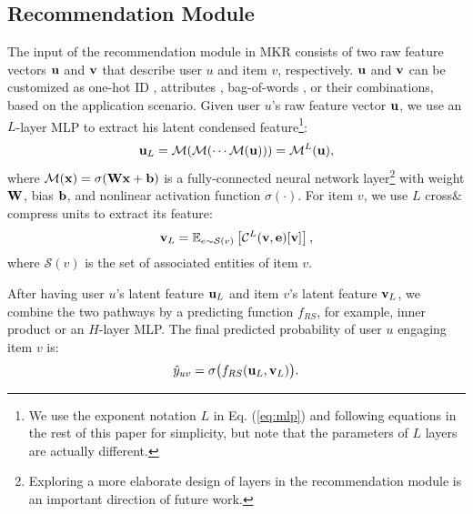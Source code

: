\documentclass[sigconf]{acmart}
\begin{document}
	\subsection{Recommendation Module}
	\label{section:rm}
		The input of the recommendation module in MKR consists of two raw feature vectors $\bf u$ and $\bf v$ that describe user $u$ and item $v$, respectively.
		$\bf u$ and $\bf v$ can be customized as one-hot ID \cite{he2017neural}, attributes \cite{wang2018shine}, bag-of-words \cite{wang2015collaborative}, or their combinations, based on the application scenario.
		Given user $u$'s raw feature vector $\bf u$, we use an $L$-layer MLP to extract his latent condensed feature\footnote{We use the exponent notation $L$ in Eq. (\ref{eq:mlp}) and following equations in the rest of this paper for simplicity, but note that the parameters of $L$ layers are actually different.}:
		\begin{equation}
		\label{eq:mlp}
			{\bf u}_L = \mathcal M (\mathcal M (\cdots \mathcal M ({\bf u}))) = \mathcal M^L ({\bf u}),
		\end{equation}				
		where $\mathcal M ({\bf x}) = \sigma ({\bf W} {\bf x} + {\bf b} )$ is a fully-connected neural network layer\footnote{Exploring a more elaborate design of layers in the recommendation module is an important direction of future work.} with weight $\bf W$, bias $\bf b$, and nonlinear activation function $\sigma(\cdot)$.
		For item $v$, we use $L$ cross$\&$compress units to extract its feature:
		\begin{equation}
			{\bf v}_L = \mathbb E_{e \sim \mathcal S(v)} \left[ \mathcal C^L ({\bf v}, {\bf e})[{\bf v}] \right],
		\end{equation}
		where $\mathcal S(v)$ is the set of associated entities of item $v$.
		
		After having user $u$'s latent feature ${\bf u}_L$ and item $v$'s latent feature ${\bf v}_L$, we combine the two pathways by a predicting function $f_{RS}$, for example, inner product or an $H$-layer MLP.
		The final predicted probability of user $u$ engaging item $v$ is:
		\begin{equation}
		\hat y_{uv} = \sigma \big( f_{RS}({\bf u}_L, {\bf v}_L) \big).		\end{equation}		
	
	
\end{document}
